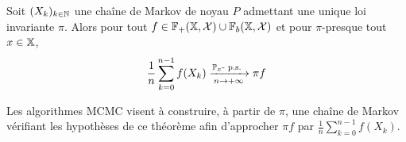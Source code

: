 \documentclass[10pt,a4paper]{article}
\begin{document}


\begin{Thm}\label{thm:ergodic}
	Soit $(X_k)_{k \in \mathbb{N}}$ une chaîne de Markov de noyau $P$ admettant une unique loi invariante $\pi$. Alors pour tout $f \in \mathbb{F}_+(\mathbb{X}, \mathcal{X}) \cup \mathbb{F}_b(\mathbb{X}, \mathcal{X})$ et pour $\pi$-presque tout $x \in \mathbb{X}$,
	$$\frac{1}{n} \sum_{k=0}^{n-1} f(X_k) \xrightarrow[n \to +\infty]{\PP_x\text{-}\ps} \pi f$$
\end{Thm}

Les algorithmes MCMC visent à construire, à partir de $\pi$, une chaîne de Markov vérifiant les hypothèses de ce théorème afin d'approcher $\pi f$ par $\frac{1}{n} \sum_{k=0}^{n-1} f(X_k)$.
\end{document}

